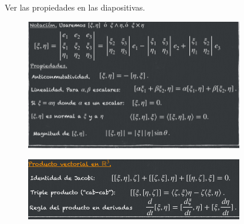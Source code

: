 \documentclass{article}
\begin{document}
Ver las propiedades en las diapositivas. 
\begin{figure}[H]
  \begin{center}
    \includegraphics[width=0.85\textwidth]{1.png}
  \end{center}
\end{figure}
\begin{figure}[H]
  \begin{center}
    \includegraphics[width=0.85\textwidth]{2.png}
  \end{center}
\end{figure}



\end{document}
